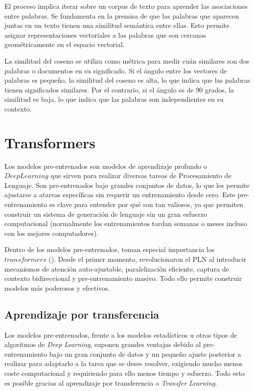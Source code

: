 El proceso implica iterar sobre un corpus de texto para aprender las asociaciones entre palabras. Se fundamenta en la premisa de que las palabras que aparecen juntas en un texto tienen una similitud semántica entre ellas. Esto permite asignar representaciones vectoriales a las palabras que son cercanas geométricamente en el espacio vectorial.

La similitud del coseno se utiliza como métrica para medir cuán similares son dos palabras o documentos en su significado. Si el ángulo entre los vectores de palabras es pequeño, la similitud del coseno es alta, lo que indica que las palabras tienen significados similares. Por el contrario, si el ángulo es de 90 grados, la similitud es baja, lo que indica que las palabras son independientes en su contexto.

\section{Transformers}
\label{sec:Transformers}

Los modelos pre-entrenados son modelos de aprendizaje profundo o $Deep Learning$ que sirven para realizar diversas tareas de Procesamiento de Lenguaje. Son pre-entrenados bajo grandes conjuntos de datos, lo que les permite ajustarse a atareas específicas sin requerir un entrenamiento desde cero. Este pre-entrenamiento es clave para entender por qué son tan valiosos, ya que permiten construir un sistema de generación de lenguaje sin un gran esfuerzo computacional (normalmente los entrenamientos tardan semanas o meses incluso con los mejores computadores). 

Dentro de los modelos pre-entrenados, toman especial importancia los $transformers$ (\cite{transformers}). Desde el primer momento, revolucionaron el PLN al introducir mecanismos de atención auto-ajustable, paralelización eficiente, captura de contexto bidireccional y pre-entrenamiento masivo. Todo ello permite construir modelos más poderosos y efectivos. 

\subsection{Aprendizaje por transferencia}
Los modelos pre-entrenados, frente a los modelos estadísticos u otros tipos de algoritmos de \textit{Deep Learning}, suponen grandes ventajas debido al pre-entrenamiento bajo un gran conjunto de datos y un pequeño ajuste posterior a realizar para adaptarlo a la tarea que se desee resolver, exigiendo mucho menos coste computacional y requiriendo para ello menos tiempo y esfuerzo. Todo esto es posible gracias al aprendizaje por transferencia o \textit{Transfer Learning}.

